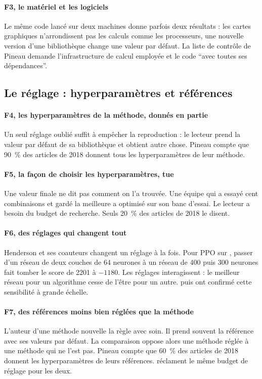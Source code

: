 \paragraph{F3, le matériel et les logiciels}
Le même code lancé sur deux machines donne parfois deux résultats : les cartes graphiques n'arrondissent
pas les calculs comme les processeurs, une nouvelle version d'une bibliothèque change une valeur par
défaut. La liste de contrôle de Pineau demande l'infrastructure de calcul employée et le code
\enquote{avec toutes ses dépendances}.

\subsection{Le réglage : hyperparamètres et références}

\paragraph{F4, les hyperparamètres de la méthode, donnés en partie}
Un seul réglage oublié suffit à empêcher la reproduction : le lecteur prend la valeur par défaut de sa
bibliothèque et obtient autre chose. Pineau compte que 90~\% des articles de 2018 donnent tous les
hyperparamètres de leur méthode.

\paragraph{F5, la façon de choisir les hyperparamètres, tue}
Une valeur finale ne dit pas comment on l'a trouvée. Une équipe qui a essayé cent combinaisons et
gardé la meilleure a optimisé sur son banc d'essai. Le lecteur a besoin du budget de recherche. Seuls
20~\% des articles de 2018 le disent.

\paragraph{F6, des réglages qui changent tout}
Henderson et ses coauteurs changent un réglage à la fois. Pour PPO sur , passer d'un
réseau de deux couches de 64 neurones à un réseau de 400 puis 300 neurones fait tomber le score de
\num{2201} à $\num{-1180}$. Les réglages interagissent : le meilleur réseau pour un algorithme cesse de l'être
pour un autre. \textcite{engstrom2020implementation} puis \textcite{andrychowicz2021matters} ont confirmé
cette sensibilité à grande échelle.

\paragraph{F7, des références moins bien réglées que la méthode}
L'auteur d'une méthode nouvelle la règle avec soin. Il prend souvent la référence avec ses valeurs par
défaut. La comparaison oppose alors une méthode réglée à une méthode qui ne l'est pas. Pineau compte
que 60~\% des articles de 2018 donnent les hyperparamètres de leurs références.
\textcite{eimer2023hyperparameters} réclament le même budget de réglage pour les deux.

